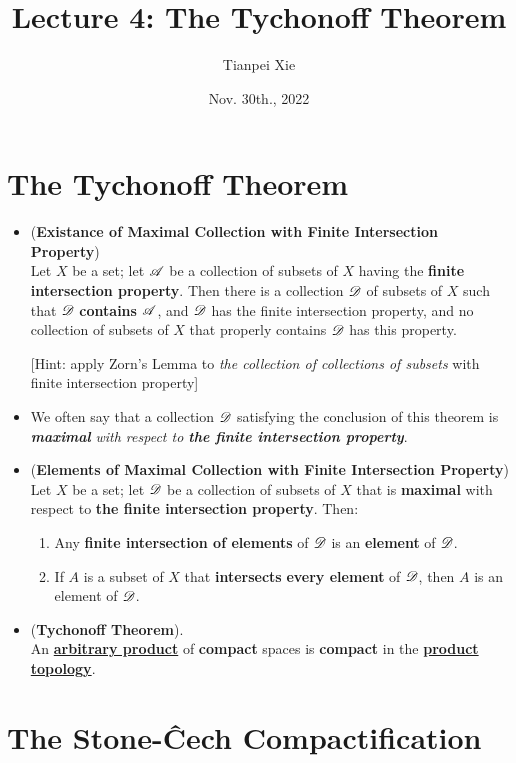 \documentclass[11pt]{article}
\begin{document}
\title{Lecture 4: The Tychonoff Theorem}
\author{ Tianpei Xie}
\date{Nov. 30th., 2022}
\maketitle
\tableofcontents
\newpage
\section{The Tychonoff Theorem}
\begin{itemize}
\item \begin{lemma} (\textbf{Existance of Maximal Collection with Finite Intersection Property}) \citep{munkres2000topology}\\
Let $X$ be a set; let ${\mathscr A}$ be a collection of subsets of $X$ having the \textbf{finite intersection property}. Then there is a collection ${\mathscr D}$ of subsets of $X$ such that ${\mathscr D}$ \textbf{contains} ${\mathscr A}$, and ${\mathscr D}$ has the finite intersection property, and no collection of subsets of $X$ that properly contains ${\mathscr D}$ has this property.
\end{lemma}
[Hint: apply Zorn's Lemma to \emph{the collection of collections of subsets} with finite intersection property]

\item \begin{definition}
We often say that a collection ${\mathscr D}$ satisfying the conclusion of this theorem is \emph{\textbf{maximal}} \emph{with respect to \textbf{the finite intersection property}}.
\end{definition}

\item \begin{lemma} (\textbf{Elements of Maximal Collection with Finite Intersection Property})  \citep{munkres2000topology}\\
Let $X$ be a set; let ${\mathscr D}$ be a collection of subsets of $X$ that is \textbf{maximal} with respect to \textbf{the finite intersection property}. Then:
\begin{enumerate}
\item Any \textbf{finite intersection of elements} of ${\mathscr D}$ is an \textbf{element} of ${\mathscr D}$.
\item If $A$ is a subset of $X$ that \textbf{intersects} \textbf{every element }of ${\mathscr D}$, then $A$ is an element of ${\mathscr D}$.
\end{enumerate}
\end{lemma}

\item \begin{theorem} (\textbf{Tychonoff Theorem}). \citep{munkres2000topology} \\
 An \underline{\textbf{arbitrary product}} of \textbf{compact} spaces is \textbf{compact} in the \underline{\textbf{product topology}}.
\end{theorem}
\end{itemize}

\section{The Stone-{\^C}ech Compactification}

\newpage


\end{document}

